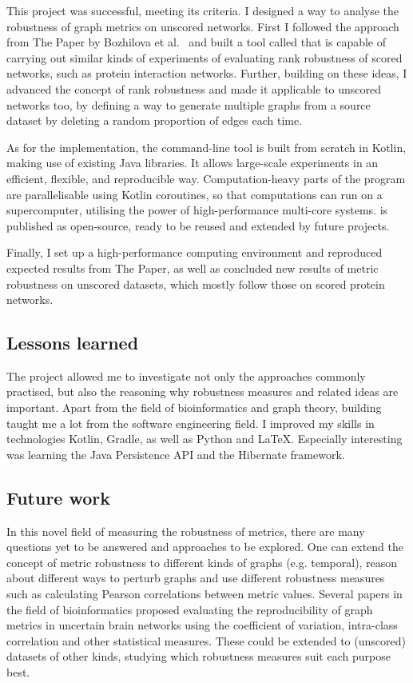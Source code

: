 This project was successful, meeting its criteria.
I designed a way to analyse the robustness of graph metrics on unscored networks.
First I followed the approach from The Paper by Bozhilova et al.~\cite{Bozhilova2019} and built a tool called \graffs that is capable of carrying out similar kinds of experiments of evaluating rank robustness of scored networks, such as protein interaction networks.
Further, building on these ideas, I advanced the concept of rank robustness and made it applicable to unscored networks too, by defining a way to generate multiple graphs from a source dataset by deleting a random proportion of edges each time.

As for the implementation, the command-line tool \graffs is built from scratch in Kotlin, making use of existing Java libraries.
It allows large-scale experiments in an efficient, flexible, and reproducible way.
Computation-heavy parts of the program are parallelisable using Kotlin coroutines, so that computations can run on a supercomputer, utilising the power of high-performance multi-core systems.
\graffs is published as open-source, ready to be reused and extended by future projects.

Finally, I set up a high-performance computing environment and reproduced expected results from The Paper, as well as concluded new results of metric robustness on unscored datasets, which mostly follow those on scored protein networks.


\subsection*{Lessons learned}

The project allowed me to investigate not only the approaches commonly practised, but also the reasoning why robustness measures and related ideas are important.
Apart from the field of bioinformatics and graph theory, building \graffs taught me a lot from the software engineering field.
I improved my skills in technologies Kotlin, Gradle, as well as Python and LaTeX.
Especially interesting was learning the Java Persistence API and the Hibernate framework.


\subsection*{Future work}

In this novel field of measuring the robustness of metrics, there are many questions yet to be answered and approaches to be explored.
One can extend the concept of metric robustness to different kinds of graphs (e.g. temporal), reason about different ways to perturb graphs and use different robustness measures such as calculating Pearson correlations between metric values.
Several papers in the field of bioinformatics proposed evaluating the reproducibility of graph metrics in uncertain brain networks using the coefficient of variation, intra-class correlation and other statistical measures.
These could be extended to (unscored) datasets of other kinds, studying which robustness measures suit each purpose best.

